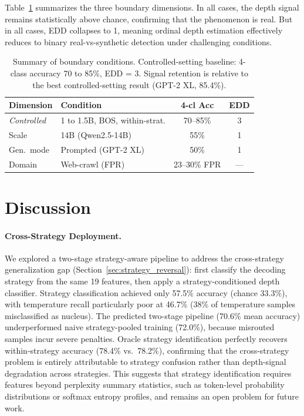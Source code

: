 \documentclass[11pt,a4paper]{article}
\begin{document}
Table~\ref{tab:boundary_summary} summarizes the three boundary dimensions.
In all cases, the depth signal remains statistically above chance, confirming that the phenomenon is real.
But in all cases, EDD collapses to 1, meaning ordinal depth estimation effectively reduces to binary real-vs-synthetic detection under challenging conditions.

\begin{table}[t]
\centering
\caption{Summary of boundary conditions. Controlled-setting baseline: 4-class accuracy 70 to 85\%, EDD = 3. Signal retention is relative to the best controlled-setting result (GPT-2 XL, 85.4\%).}
\label{tab:boundary_summary}
\small
\begin{tabular}{llcc}
\toprule
Dimension & Condition & 4-cl Acc & EDD \\
\midrule
\emph{Controlled} & 1 to 1.5B, BOS, within-strat. & 70--85\% & 3 \\
\midrule
Scale & 14B (Qwen2.5-14B) & 55\% & 1 \\
Gen.\ mode & Prompted (GPT-2 XL) & 50\% & 1 \\
Domain & Web-crawl (FPR) & 23--30\% FPR & --- \\
\bottomrule
\end{tabular}
\end{table}


\section{Discussion}
\label{sec:discussion}

\paragraph{Cross-Strategy Deployment.}
We explored a two-stage strategy-aware pipeline to address the cross-strategy generalization gap (Section~\ref{sec:strategy_reversal}): first classify the decoding strategy from the same 19 features, then apply a strategy-conditioned depth classifier.
Strategy classification achieved only 57.5\% accuracy (chance 33.3\%), with temperature recall particularly poor at 46.7\% (38\% of temperature samples misclassified as nucleus).
The predicted two-stage pipeline (70.6\% mean accuracy) underperformed naive strategy-pooled training (72.0\%), because misrouted samples incur severe penalties.
Oracle strategy identification perfectly recovers within-strategy accuracy (78.4\% vs.\ 78.2\%), confirming that the cross-strategy problem is entirely attributable to strategy confusion rather than depth-signal degradation across strategies.
This suggests that strategy identification requires features beyond perplexity summary statistics, such as token-level probability distributions or softmax entropy profiles, and remains an open problem for future work.
\end{document}
